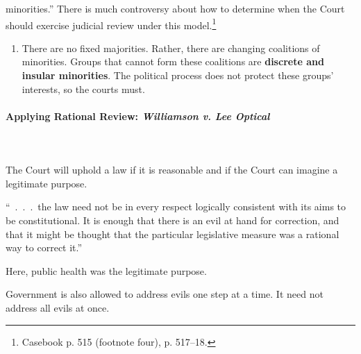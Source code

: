 \begin{enumerate}
    minorities.'' There is much controversy about how to determine when the 
    Court should exercise judicial review under this model.\footnote{Casebook 
    p. 515 (footnote four), p. 517--18.}
    \begin{enumerate}
        \item There are no fixed majorities. Rather, there are changing 
        coalitions of minorities. Groups that cannot form these coalitions are 
        \textbf{discrete and insular minorities}. The political process does 
        not protect these groups' interests, so the courts must.
    \end{enumerate}
\end{enumerate}

\paragraph{Applying Rational Review: \emph{Williamson v. Lee Optical}}
~\\\\
The Court will uphold a law if it is reasonable and if the Court can imagine a 
legitimate purpose.

``~.~.~.~the law need not be in every respect logically consistent with its 
aims to be constitutional. It is enough that there is an evil at hand for 
correction, and that it might be thought that the particular legislative 
measure was a rational way to correct it.''

Here, public health was the legitimate purpose.

Government is also allowed to address evils one step at a time. It need not 
address all evils at once.

